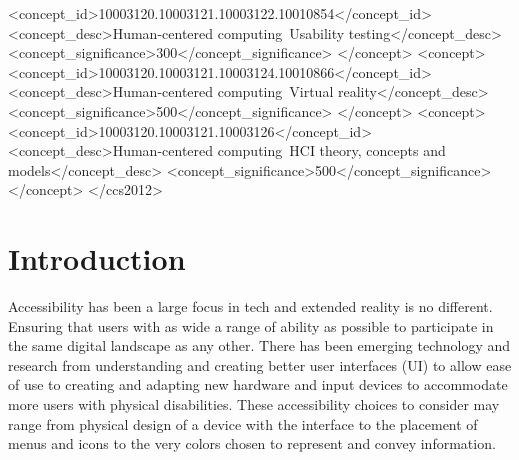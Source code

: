 \documentclass[acmlarge]{acmart}
\begin{document}
\begin{CCSXML}
         <concept_id>10003120.10003121.10003122.10010854</concept_id>
         <concept_desc>Human-centered computing~Usability testing</concept_desc>
         <concept_significance>300</concept_significance>
         </concept>
     <concept>
         <concept_id>10003120.10003121.10003124.10010866</concept_id>
         <concept_desc>Human-centered computing~Virtual reality</concept_desc>
         <concept_significance>500</concept_significance>
         </concept>
     <concept>
         <concept_id>10003120.10003121.10003126</concept_id>
         <concept_desc>Human-centered computing~HCI theory, concepts and models</concept_desc>
         <concept_significance>500</concept_significance>
         </concept>
   </ccs2012>
\end{CCSXML}
  





\maketitle

\section{Introduction}
Accessibility has been a large focus in tech and extended reality is no different. Ensuring that users
with as wide a range of ability as possible to participate in the same digital landscape as any other. There has been emerging technology and research from
understanding and creating better user interfaces (UI) to allow ease of use to creating and adapting new hardware and input devices to accommodate more 
users with physical disabilities. These accessibility choices to consider may range from physical design of a device with the interface to the placement of menus
and icons to the very colors chosen to represent and convey information.
\end{document}
